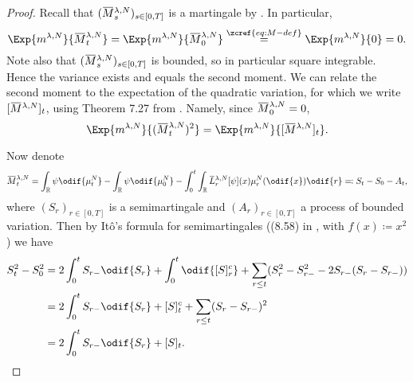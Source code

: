 \begin{proof}
  Recall that \((\ol{M}_s^{\lambda,N})_{s\in[0,T]}\) is a martingale by .
  In particular,
  \begin{equation}
    \Exp{\lawmu^{\lambda,N}}{\ol{M}_t^{\lambda,N}} = \Exp{\lawmu^{\lambda,N}}{\ol{M}_0^{\lambda,N}}
    \overset{\zcref{eq:M-def}}{=} \Exp{\lawmu^{\lambda,N}}{0} = 0.
  \end{equation}
  Note also that \((\ol{M}_s^{\lambda,N})_{s\in[0,T]}\) is bounded, so in particular square integrable.
  Hence the variance exists and equals the second moment.
  We can relate the second moment to the expectation of the quadratic variation, for which we write \(\sbr{\ol{M}^{\lambda,N}}_t\), using Theorem 7.27 from \cite[201]{klebanerIntroductionStochasticCalculus2012}.
  Namely, since \(\ol{M}_0^{\lambda,N} = 0\),
  \begin{equation}
    \Exp{\lawmu^{\lambda,N}}{(\ol{M}_t^{\lambda,N})^2} = \Exp{\lawmu^{\lambda,N}}{\sbr{\ol{M}^{\lambda,N}}_t}.
  \end{equation}

  Now denote
  \begin{equation}\label{eq:M=S-A}
    \ol{M}_t^{\lambda,N} = \int_\potspace \psi \odif{\mu_t^N} - \int_\potspace \psi \odif{\mu_0^N} - \int_0^t \int_\potspace \ol{L}_r^{\lambda, N} [\psi](x) \mu_{r}^N(\odif{x}) \odif{r}
    \eqqcolon S_t - S_0 - A_t,
  \end{equation}
  where \((S_r)_{r\in[0,T]}\) is a semimartingale and \((A_r)_{r\in[0,T]}\) a process of bounded variation.
  Then by Itô's formula for semimartingales ((8.58) in \cite[236]{klebanerIntroductionStochasticCalculus2012}, with \(f(x) \coloneqq x^2\)) we have
  \begin{equation}\label{eq:S^2-q-var-rel}
    \begin{split}
      S_t^2 - S_0^2
       & = 2 \int_0^t S_{r-} \odif{S_r} + \int_0^t \odif{\sbr{S}_r^c}
      + \sum_{r \leq t} \br{ S_r^2 - S_{r-}^2  - 2 S_{r-} (S_r - S_{r-}) } \\
       & = 2 \int_0^t S_{r-} \odif{S_r} + \sbr{S}_t^c
      + \sum_{r \leq t} \br{ S_r - S_{r-} }^2                              \\
       & = 2 \int_0^t S_{r-} \odif{S_r} + \sbr{S}_t.
    \end{split}
  \end{equation}


\end{proof}
